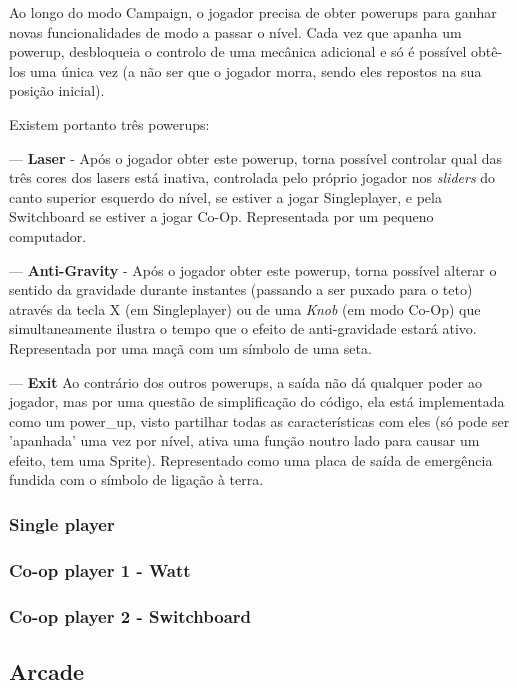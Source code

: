 \documentclass{report}
\begin{document}
Ao longo do modo Campaign, o jogador precisa de obter powerups para ganhar novas funcionalidades de modo a passar o nível. Cada vez que apanha um powerup, desbloqueia o controlo de uma mecânica adicional e só é possível obtê-los uma única vez (a não ser que o jogador morra, sendo eles repostos na sua posição inicial).

Existem portanto três powerups:
\newline

--- \textbf{Laser} - Após o jogador obter este powerup, torna possível controlar qual das três cores dos lasers está inativa, controlada pelo próprio jogador nos \textit{sliders} do canto superior esquerdo do nível, se estiver a jogar Singleplayer, e pela Switchboard se estiver a jogar Co-Op. Representada por um pequeno computador.

--- \textbf{Anti-Gravity} - Após o jogador obter este powerup, torna possível alterar o sentido da gravidade durante instantes (passando a ser puxado para o teto) através da tecla X (em Singleplayer) ou de uma \textit{Knob}  (em  modo Co-Op) que simultaneamente ilustra o tempo que o efeito de anti-gravidade estará ativo. Representada por uma maçã com um símbolo de uma seta.

--- \textbf{Exit} Ao contrário dos outros powerups, a saída não dá qualquer poder ao jogador, mas por uma questão de simplificação do código, ela está implementada como um power\_up, visto partilhar todas as características com eles (só pode ser 'apanhada' uma vez por nível, ativa uma função noutro lado para causar um efeito, tem uma Sprite). Representado como uma placa de saída de emergência fundida com o símbolo de ligação à terra.

\subsubsection{Single player}

\subsubsection{Co-op player 1 - Watt}

\subsubsection{Co-op player 2 - Switchboard}

\subsection{Arcade}
\end{document}
